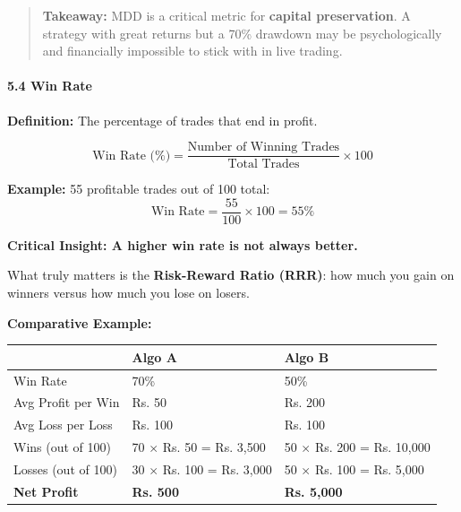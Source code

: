 \documentclass[12pt,openany]{book}
\begin{document}
\begin{quote}
    \textbf{Takeaway:} MDD is a critical metric for \textbf{capital preservation}. A strategy with great returns but a 70\% drawdown may be psychologically and financially impossible to stick with in live trading.
\end{quote}

\paragraph{5.4 Win Rate}

\textbf{Definition:} The percentage of trades that end in profit.

\begin{equation*}
    \text{Win Rate (\%)} = \frac{\text{Number of Winning Trades}}{\text{Total Trades}} \times 100
\end{equation*}

\textbf{Example:} 55 profitable trades out of 100 total:
\begin{equation*}
    \text{Win Rate} = \frac{55}{100} \times 100 = 55\%
\end{equation*}

\textbf{Critical Insight: A higher win rate is not always better.}

What truly matters is the \textbf{Risk-Reward Ratio (RRR)}: how much you gain on winners versus how much you lose on losers.

\textbf{Comparative Example:}

\begin{center}
\begin{tabular}{|L{0.27\textwidth}|L{0.28\textwidth}|L{0.28\textwidth}|}
\hline
 & \textbf{Algo A} & \textbf{Algo B} \\
\hline
Win Rate & 70\% & 50\% \\
\hline
Avg Profit per Win & Rs. 50 & Rs. 200 \\
\hline
Avg Loss per Loss & Rs. 100 & Rs. 100 \\
\hline
Wins (out of 100) & 70 $\times$ Rs. 50 = Rs. 3,500 & 50 $\times$ Rs. 200 = Rs. 10,000 \\
\hline
Losses (out of 100) & 30 $\times$ Rs. 100 = Rs. 3,000 & 50 $\times$ Rs. 100 = Rs. 5,000 \\
\hline
\textbf{Net Profit} & \textbf{Rs. 500} & \textbf{Rs. 5,000} \\
\hline
\end{tabular}
\end{center}
\end{document}
